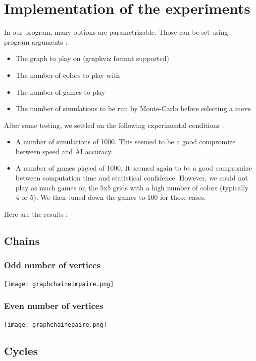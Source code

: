 \section{Implementation of the experiments}


In our program, many options are parametrizable. Those can be set using program arguments :
\begin{itemize}
\item The graph to play on (graphviz format supported)
\item The number of colors to play with
\item The number of games to play
\item The number of simulations to be run by Monte-Carlo before selecting a move
\end{itemize}
After some testing, we settled on the following experimental conditions :
\begin{itemize}
\item A number of simulations of 1000. This seemed to be a good compromize between speed and AI accuracy.
\item A number of games played of 1000. It seemed again to be a good compromize between computation time and statistical confidence. However, we could not play as much games on the 5x5 grids with a high number of colors (typically 4 or 5). We then tuned down the games to 100 for those cases. 
\end{itemize}

Here are the results :\\

\subsection{Chains}

\subsubsection{Odd number of vertices}

\texttt{[image: graphchaineimpaire.png]}

\subsubsection{Even number of vertices}

\texttt{[image: graphchainepaire.png]}

\subsection{Cycles}

